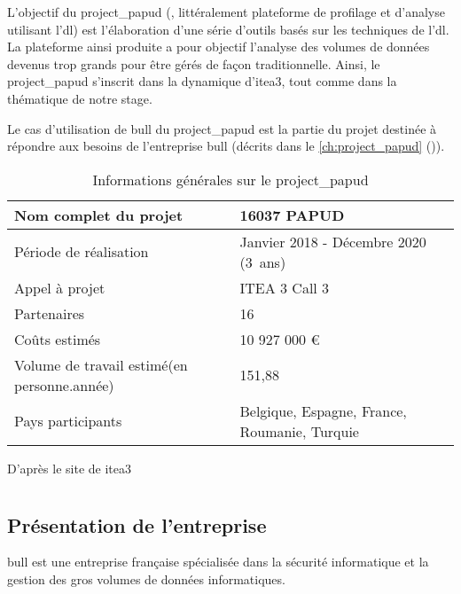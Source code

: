 L'objectif du \gls{project_papud} (, littéralement \og plateforme de profilage et d'analyse utilisant l'\gls{dl}\fg{}) est l'élaboration d'une série d'outils basés sur les techniques de l'\gls{dl}.
La plateforme ainsi produite a pour objectif l'analyse des volumes de données devenus trop grands pour être gérés de façon traditionnelle.
Ainsi, le \gls{project_papud} s'inscrit dans la dynamique d'\gls{itea3}, tout comme dans la thématique de notre stage.

Le cas d'utilisation de \gls{bull} du \gls{project_papud} est la partie du projet destinée à répondre aux besoins de l'entreprise \gls{bull} (décrits dans le \autoref{ch:project_papud} ()).

\begin{table}[h]{
	\centering
	\renewcommand{\arraystretch}{1.5}
	\setlength\tabcolsep{1em}
	\begin{tabularx}{\textwidth}{|X|l|}
		\hline
		Nom complet du projet & 16037 PAPUD\\
		\hline
		Période de réalisation & Janvier 2018 - Décembre 2020 (3~ans)\\
		\hline
		Appel à projet & ITEA 3 Call 3\\
		\hline
		Partenaires & 16\\
		\hline
		Coûts estimés & 10 927 000 €\\
		\hline
		Volume de travail estimé\newline (en personne.année) & 151,88 \\
		\hline
		Pays participants & Belgique, Espagne, France, \mbox{Roumanie}, Turquie\\
		\hline
	\end{tabularx}
	\renewcommand{\arraystretch}{1}}

	{\footnotesize D'après le site de \gls{itea3} \autocite{about_papud}} \label{tab:about_papud}
	\caption[Informations générales sur le ]{Informations générales sur le \gls{project_papud}}
\end{table}

\section{}
\subsection{Présentation de l'entreprise}
\gls{bull} est une entreprise française spécialisée dans la sécurité informatique et la gestion des gros volumes de données informatiques. 

